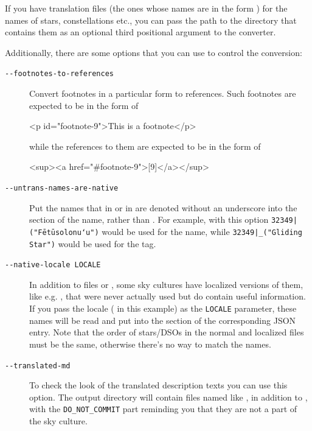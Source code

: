 If you have  translation files (the ones whose names are in the form ) for the names of stars, constellations etc., 
you can pass the path to the directory that contains them as an optional third positional argument to the converter.

Additionally, there are some options that you can use to control the conversion:

\begin{description}
\item[\texttt{-\/-footnotes-to-references}] Convert footnotes in a particular form to references. Such footnotes are expected to be in the form of
\begin{htmlbit}
<p id="footnote-9">This is a footnote</p>
\end{htmlbit}
while the references to them are expected to be in the form of
\begin{htmlbit}
<sup><a href="#footnote-9">[9]</a></sup>
\end{htmlbit}
\item[\texttt{-\/-untrans-names-are-native}] Put the names that in  or in 
       are denoted without an underscore into the  section of the name, 
      rather than . For example, with this option \texttt{32349|("Fētūsolonuʻu")} would be 
      used for the  name, while \texttt{32349|\_("Gliding Star")} would be used for the  tag.
\item[\texttt{-\/-native-locale LOCALE}] In addition to files  or , 
      some sky cultures have localized versions of them, like e.g. , 
      that were never actually used but do contain useful information. If you pass the locale ( in this example) 
      as the \texttt{LOCALE} parameter, these names will be read and put into the  section of the corresponding JSON entry. 
      Note that the order of stars/DSOs in the normal and localized files must be the same, otherwise there's no way to match the names.
\item[\texttt{-\/-translated-md}] To check the look of the translated description texts you can use this option. 
      The output directory will contain files named like 
      , in addition to , 
      with the \texttt{DO\_NOT\_COMMIT} part reminding you that they are not a part of the sky culture.
\end{description}

